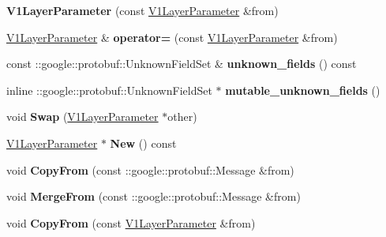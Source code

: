 \begin{DoxyCompactItemize}
{\bfseries V1\+Layer\+Parameter} (const \mbox{\hyperlink{classcaffe_1_1_v1_layer_parameter}{V1\+Layer\+Parameter}} \&from)
\item 
\mbox{\label{classcaffe_1_1_v1_layer_parameter_ab47fe5306dd0c5fe575b14f3f737c4c7}} 
\mbox{\hyperlink{classcaffe_1_1_v1_layer_parameter}{V1\+Layer\+Parameter}} \& {\bfseries operator=} (const \mbox{\hyperlink{classcaffe_1_1_v1_layer_parameter}{V1\+Layer\+Parameter}} \&from)
\item 
\mbox{\label{classcaffe_1_1_v1_layer_parameter_a622a93ddbe3bf5a872a3d9288780b49d}} 
const \+::google\+::protobuf\+::\+Unknown\+Field\+Set \& {\bfseries unknown\+\_\+fields} () const
\item 
\mbox{\label{classcaffe_1_1_v1_layer_parameter_acadc5d75e2d2d18df6553e8abec0b496}} 
inline \+::google\+::protobuf\+::\+Unknown\+Field\+Set $\ast$ {\bfseries mutable\+\_\+unknown\+\_\+fields} ()
\item 
\mbox{\label{classcaffe_1_1_v1_layer_parameter_acab8164c3397503af61f75dcd81c4268}} 
void {\bfseries Swap} (\mbox{\hyperlink{classcaffe_1_1_v1_layer_parameter}{V1\+Layer\+Parameter}} $\ast$other)
\item 
\mbox{\label{classcaffe_1_1_v1_layer_parameter_a4414b9bf0b393efc796d3377b398feb9}} 
\mbox{\hyperlink{classcaffe_1_1_v1_layer_parameter}{V1\+Layer\+Parameter}} $\ast$ {\bfseries New} () const
\item 
\mbox{\label{classcaffe_1_1_v1_layer_parameter_a001cfb72d3029c03a8713cb241bde8e1}} 
void {\bfseries Copy\+From} (const \+::google\+::protobuf\+::\+Message \&from)
\item 
\mbox{\label{classcaffe_1_1_v1_layer_parameter_ad04f3b2afc9ea59f2eb6cf7ec36b2a20}} 
void {\bfseries Merge\+From} (const \+::google\+::protobuf\+::\+Message \&from)
\item 
\mbox{\label{classcaffe_1_1_v1_layer_parameter_a14f0eece97303690418870e7f6b1e314}} 
void {\bfseries Copy\+From} (const \mbox{\hyperlink{classcaffe_1_1_v1_layer_parameter}{V1\+Layer\+Parameter}} \&from)

\end{DoxyCompactItemize}
